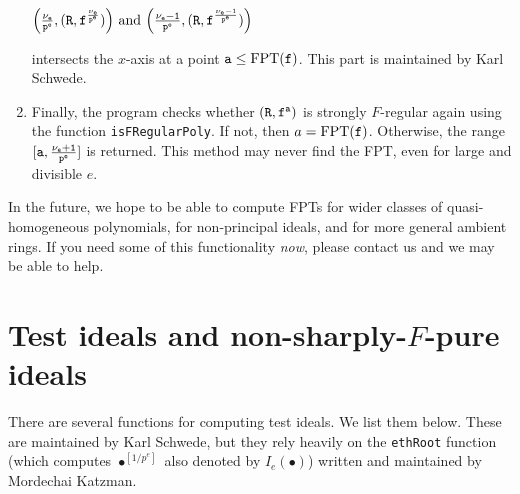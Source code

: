 \documentclass[11pt,fullpage]{amsart}
\theoremstyle{definition}
\theoremstyle{remark}
\begin{document}
\begin{enumerate}
    \begin{center}
${\tt \Big( {\nu_e \over p^e}, (R, f^{\nu_e \over p^e}) \Big) } \text{ and } {\tt \Big( {\nu_e - 1 \over p^e}, (R, f^{\nu_e - 1 \over p^e}) \Big)}$
    \end{center}
    intersects the $x$-axis at a point ${\tt a} \leq  \mathrm{FPT}({\tt f})$.  This part is maintained by Karl Schwede.
\item Finally, the program checks whether ${\tt (R, f^{a})}$ is strongly $F$-regular again using the function {\tt isFRegularPoly}.    If not, then $a = \mathrm{FPT}({\tt f})$.  Otherwise, the range ${\tt [a, {\nu_e + 1 \over p^e}]}$ is returned.  This method may never find the FPT, even for large and divisible $e$.
\end{enumerate}

In the future, we hope to be able to compute FPTs for wider classes of quasi-homogeneous polynomials, for non-principal ideals, and for more general ambient rings.  If you need some of this functionality \emph{now}, please contact us and we may be able to help.

\section{Test ideals and non-sharply-$F$-pure ideals}

There are several functions for computing test ideals.  We list them below.  These are maintained by Karl Schwede, but they rely heavily on the {\tt ethRoot} function (which computes $\bullet^{[1/p^e]}$ also denoted by $I_e(\bullet)$) written and maintained by Mordechai Katzman.
\end{document}
